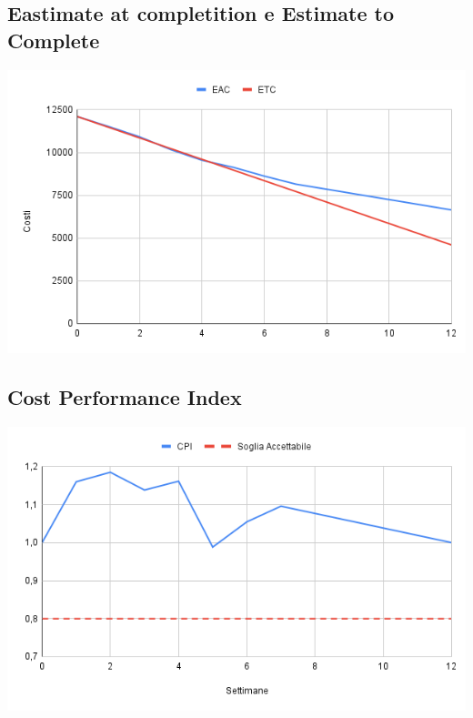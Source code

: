 \documentclass[a4paper, 12pt]{article}
\begin{document}
\subsection{Eastimate at completition e Estimate to Complete}
\begin{center}
	\includegraphics[scale=0.6]{EAC_ETC.png}
\end{center}
\subsection{Cost Performance Index}
\begin{center}
	\includegraphics[scale=0.6]{CPI.png}
\end{center}
\end{document}
